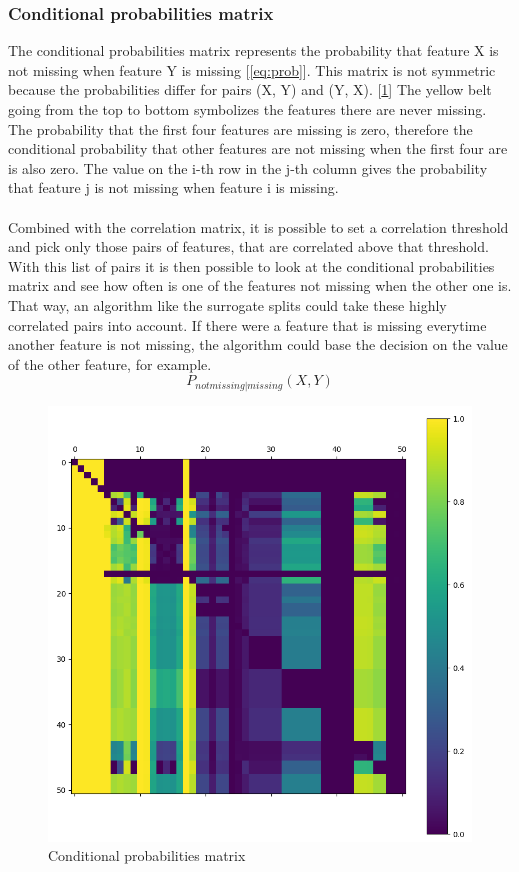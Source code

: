 \documentclass[11pt]{article}
\begin{document}
      \subsubsection{Conditional probabilities matrix}
        The conditional probabilities matrix represents the probability that feature X is not missing when feature Y is missing [\ref{eq:prob}]. This matrix is not symmetric because the probabilities differ for pairs (X, Y) and (Y, X). [\ref{figure:cond_prob_matrix}] The yellow belt going from the top to bottom symbolizes the features there are never missing.  The probability that the first four features are missing is zero, therefore the conditional probability that other features are not missing when the first four are is also zero. The value on the i-th row in the j-th column gives the probability that feature j is not missing when feature i is missing.
        \\~\\
        Combined with the correlation matrix, it is possible to set a correlation threshold and pick only those pairs of features, that are correlated above that threshold. With this list of pairs it is then possible to look at the conditional probabilities matrix and see how often is one of the features not missing when the other one is. That way, an algorithm like the surrogate splits \cite{splits} could take these highly correlated pairs into account. If there were a feature that is missing everytime another feature is not missing, the algorithm could base the decision on the value of the other feature, for example.
        \begin{equation}
          \label{eq:prob}
          P_{not missing | missing}(X, Y)
        \end{equation}
        \begin{figure}
          \centering
          \caption{Conditional probabilities matrix}
          \label{figure:cond_prob_matrix}
          \includegraphics[scale=0.6]{thesis_res/cond/heatmap_cropped.png}
        \end{figure}
  \newpage
\end{document}
